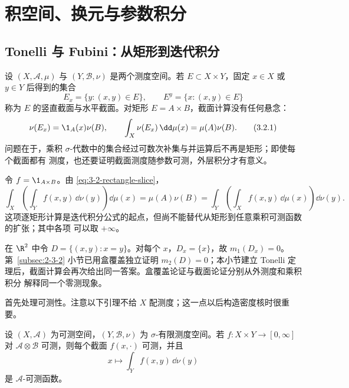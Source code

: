 \section{积空间、换元与参数积分}\label{sec:03-02}

\subsection{Tonelli 与 Fubini：从矩形到迭代积分}\label{subsec:3-2-1}

设 $(X,\mathcal A,\mu)$ 与 $(Y,\mathcal B,\nu)$ 是两个测度空间。若 $E\subset X\times Y$，固定
$x\in X$ 或 $y\in Y$ 后得到的集合
\[
 E_x=\{y:(x,y)\in E\},\qquad E^y=\{x:(x,y)\in E\}
\]
称为 $E$ 的竖直截面与水平截面。对矩形 $E=A\times B$，截面计算没有任何悬念：
\[
 \nu(E_x)=\1_A(x)\nu(B),\qquad
 \int_X\nu(E_x)\,\dd\mu(x)=\mu(A)\nu(B).
 \tag{3.2.1}\label{eq:3-2-rectangle-slice}
\]
问题在于，乘积 $\sigma$-代数中的集合经过可数次补集与并运算后不再是矩形；即使每个截面都有
测度，也还要证明截面测度随参数可测，外层积分才有意义。

\begin{example}[矩形示性函数]\label{ex:3-2-1-1}
令 $f=\1_{A\times B}$。由 \eqref{eq:3-2-rectangle-slice}，
\[
 \int_X\left(\int_Y f(x,y)\,\dd\nu(y)\right)\dd\mu(x)
 =\mu(A)\nu(B)
 =\int_Y\left(\int_X f(x,y)\,\dd\mu(x)\right)\dd\nu(y).
\]
这项逐矩形计算是迭代积分公式的起点，但尚不能替代从矩形到任意乘积可测函数的扩张；其中各项
可以取 $+\infty$。
\end{example}

\begin{example}[对角线的两种答案]\label{ex:3-2-1-2}
在 $\R^2$ 中令 $D=\{(x,y):x=y\}$。对每个 $x$，$D_x=\{x\}$，故
$m_1(D_x)=0$。第~\ref{subsec:2-3-2} 小节已用盒覆盖独立证明 $m_2(D)=0$；本小节建立
Tonelli 定理后，截面计算会再次给出同一答案。盒覆盖论证与截面论证分别从外测度和乘积积分
解释同一个零测现象。
\end{example}

首先处理可测性。注意以下引理不给 $X$ 配测度；这一点以后构造密度核时很重要。

\begin{lemma}[非负参数积分的可测性]\label{proposition:3-2-1-3}
设 $(X,\mathcal A)$ 为可测空间，$(Y,\mathcal B,\nu)$ 为 $\sigma$-有限测度空间。若
$f:X\times Y\to[0,\infty]$ 对 $\mathcal A\otimes\mathcal B$ 可测，则每个截面
$f(x,\cdot)$ 可测，并且
\[
 x\longmapsto \int_Y f(x,y)\,\dd\nu(y)
\]
是 $\mathcal A$-可测函数。
\end{lemma}

